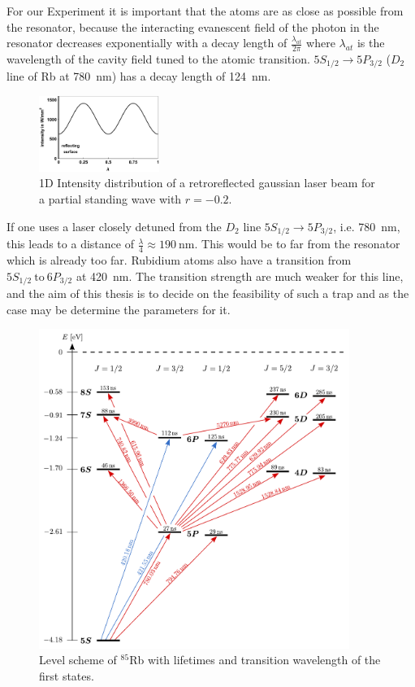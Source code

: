 For our Experiment it is important that the atoms are as close as possible from the
resonator, because the interacting evanescent field of the photon in the resonator
decreases exponentially with a decay length of \(\frac{\lambda_{at} }{2\pi} \) where 
\(\lambda_{at} \) is the wavelength of the cavity field tuned to the atomic 
transition. \(5S_{1/2} \rightarrow 5P_{3/2} \) (\(D_2 \) line of Rb at 
\SI{780}{\nano\meter}) has a decay length of \SI{124}{\nano\meter}.

\begin{figure}
    \centering
    \includegraphics[width=0.35\textwidth]{intensityplot}    
    \caption{\label{fig:intensityplot} 1D Intensity distribution of a retroreflected 
    gaussian laser beam for a partial standing wave with \(r=-0.2\).}
\end{figure}
If one uses a laser closely detuned from 
the \(D_2 \) line \(5S_{1/2} \rightarrow 5P_{3/2} \), i.e. \SI{780}{\nano\meter}, 
this leads to a distance of \(\frac{\lambda}{4} \approx \SI{190}{\nano\meter} \).
This would be to far from the resonator which is already too far. Rubidium atoms 
also have a transition from \(5S_{1/2}~\text{to}~6P_{3/2} \) at \SI{420}{\nano\meter}.
The transition strength are much weaker for this line, and the aim of this thesis 
is to decide on the feasibility of such a trap and as the case may be determine the
parameters for it.
\pagebreak

\begin{figure}[h]
    \centering
    \includegraphics[width=0.9\textwidth]{levelscheme}
    \caption{\label{fig:levelscheme} Level scheme of \(^{85}\)Rb with lifetimes
    and transition wavelength of the first states.}
\end{figure}

